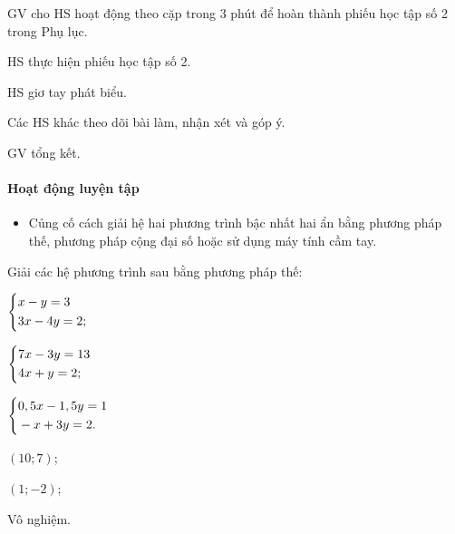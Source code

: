 \tochucthuchien

\begin{tcth}
    \buocmot
    \item GV cho HS hoạt động theo cặp trong 3 phút để hoàn thành phiếu học tập số 2 trong Phụ lục.
    \buochai
    \item HS thực hiện phiếu học tập số 2. 
    \buocba
    \item HS giơ tay phát biểu.
    \item Các HS khác theo dõi bài làm, nhận xét và góp ý.
    \buocbon
    \item GV tổng kết.
\end{tcth}

\paragraph{Hoạt động luyện tập}

\muctieu

\begin{itemize}
    \item Củng cố cách giải hệ hai phương trình bậc nhất hai ẩn bằng phương pháp thế, phương pháp cộng đại số hoặc sử dụng máy tính cầm tay.
\end{itemize}

\noidungsanpham

\begin{baitap}[1.6]
    Giải các hệ phương trình sau bằng phương pháp thế:
    \begin{listEX}[2]
        \item $\left\{\begin{aligned}&x - y = 3 \\ &3x - 4y = 2;\end{aligned}\right.$
        \item $\left\{\begin{aligned}&7x - 3y = 13 \\ &4x + y = 2;\end{aligned}\right.$
        \item $\left\{\begin{aligned}&0,5x - 1,5y = 1 \\ &-x + 3y = 2.\end{aligned}\right.$
    \end{listEX}
    \doicot
    \huongdan
    \begin{listEX}
    	\item $(10;7)$;
    	\item $(1;-2)$;
    	\item Vô nghiệm.
    \end{listEX}
\end{baitap}

